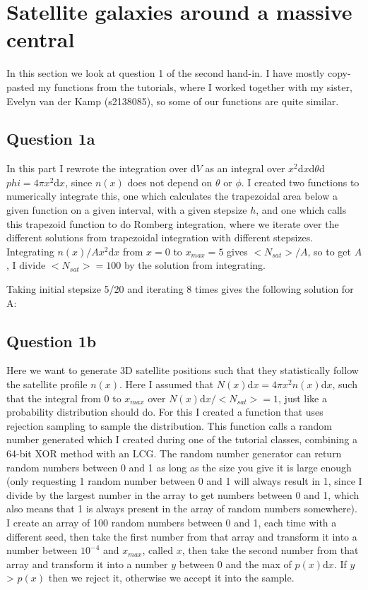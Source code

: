 \section{Satellite galaxies around a massive central}

In this section we look at question 1 of the second hand-in. 
I have mostly copy-pasted my functions from the tutorials, where I worked together with my sister,
Evelyn van der Kamp (s2138085), so some of our functions are quite similar.



\subsection{Question 1a}

In this part I rewrote the integration over d$V$ as an integral over $x^2$d$x$d$\theta$d$phi = 4\pi x^2$d$x$, since $n(x)$ does not depend on $\theta$ or $\phi$. 
I created two functions to numerically integrate this, one which calculates the trapezoidal area below a given function on a given interval, with a given stepsize $h$, and one which calls this trapezoid function to do Romberg integration, where we iterate over the different solutions from trapezoidal integration with different stepsizes.
Integrating $n(x)/A x^2$d$x$ from $x = 0$ to $x_{max} = 5$ gives $<N_{sat}>/A$, so to get $A$, I divide $<N_{sat}> = 100$ by the solution from integrating. 

Taking initial stepsize 5/20 and iterating 8 times gives the following solution for A:




\subsection{Question 1b}

Here we want to generate 3D satellite positions such that they statistically follow the satellite profile $n(x)$.
Here I assumed that $N(x)$d$x = 4\pi x^2 n(x)$d$x$, such that the integral from 0 to $x_{max}$ over $N(x)$d$x/<N_{sat}> = 1$, just like a probability distribution should do.
For this I created a function that uses rejection sampling to sample the distribution.
This function calls a random number generated which I created during one of the tutorial classes, combining a 64-bit XOR method with an LCG.
The random number generator can return random numbers between 0 and 1 as long as the size you give it is large enough (only requesting 1 random number between 0 and 1 will always result in 1, since I divide by the largest number in the array to get numbers between 0 and 1, which also means that 1 is always present in the array of random numbers somewhere).
I create an array of 100 random numbers between 0 and 1, each time with a different seed, then take the first number from that array and transform it into a number between $10^{-4}$ and $x_{max}$, called $x$, then take the second number from that array and transform it into a number $y$ between 0 and the max of $p(x)$d$x$.
If $y$ > $p(x)$ then we reject it, otherwise we accept it into the sample.

